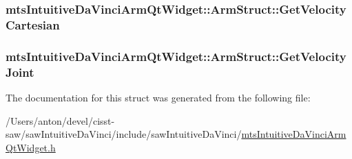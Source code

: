 \subsubsection[{Get\+Velocity\+Cartesian}]{ mts\+Intuitive\+Da\+Vinci\+Arm\+Qt\+Widget\+::\+Arm\+Struct\+::\+Get\+Velocity\+Cartesian}\label{structmts_intuitive_da_vinci_arm_qt_widget_1_1_arm_struct_ae2d860fd82111f8496a9c9047154e082}
\hypertarget{structmts_intuitive_da_vinci_arm_qt_widget_1_1_arm_struct_ab26d7fde80beb11e4c052e80d6b8c60b}{}
\subsubsection[{Get\+Velocity\+Joint}]{ mts\+Intuitive\+Da\+Vinci\+Arm\+Qt\+Widget\+::\+Arm\+Struct\+::\+Get\+Velocity\+Joint}\label{structmts_intuitive_da_vinci_arm_qt_widget_1_1_arm_struct_ab26d7fde80beb11e4c052e80d6b8c60b}


The documentation for this struct was generated from the following file\+:\begin{DoxyCompactItemize}
\item 
/\+Users/anton/devel/cisst-\/saw/saw\+Intuitive\+Da\+Vinci/include/saw\+Intuitive\+Da\+Vinci/\hyperlink{mts_intuitive_da_vinci_arm_qt_widget_8h}{mts\+Intuitive\+Da\+Vinci\+Arm\+Qt\+Widget.\+h}\end{DoxyCompactItemize}
